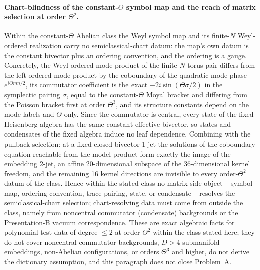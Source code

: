 \paragraph{Chart-blindness of the constant-\(\Theta\) symbol map and the reach of matrix selection at order \(\Theta^2\).} Within the constant-\(\Theta\) Abelian class the Weyl symbol map and its finite-\(N\) Weyl-ordered realization carry no semiclassical-chart datum: the map's own datum is the constant bivector plus an ordering convention, and the ordering is a gauge. Concretely, the Weyl-ordered mode product of the finite-\(N\) torus pair differs from the left-ordered mode product by the coboundary of the quadratic mode phase \(e^{i\Theta m n/2}\), its commutator coefficient is the exact \(-2i\sin(\Theta\sigma/2)\) in the symplectic pairing \(\sigma\), equal to the constant-\(\Theta\) Moyal bracket and differing from the Poisson bracket first at order \(\Theta^3\), and its structure constants depend on the mode labels and \(\Theta\) only. Since the commutator is central, every state of the fixed Heisenberg algebra has the same constant effective bivector, so states and condensates of the fixed algebra induce no leaf dependence. Combining with the pullback selection: at a fixed closed bivector 1-jet the solutions of the coboundary equation reachable from the model product form exactly the image of the embedding 2-jet, an affine 20-dimensional subspace of the 36-dimensional kernel freedom, and the remaining 16 kernel directions are invisible to every order-\(\Theta^2\) datum of the class. Hence within the stated class no matrix-side object -- symbol map, ordering convention, trace pairing, state, or condensate -- resolves the semiclassical-chart selection; chart-resolving data must come from outside the class, namely from noncentral commutator (condensate) backgrounds or the Presentation-B vacuum correspondence. These are exact algebraic facts for polynomial test data of degree \(\le 2\) at order \(\Theta^2\) within the class stated here; they do not cover noncentral commutator backgrounds, \(D>4\) submanifold embeddings, non-Abelian configurations, or orders \(\Theta^3\) and higher, do not derive the dictionary assumption, and this paragraph does not close Problem~A.
